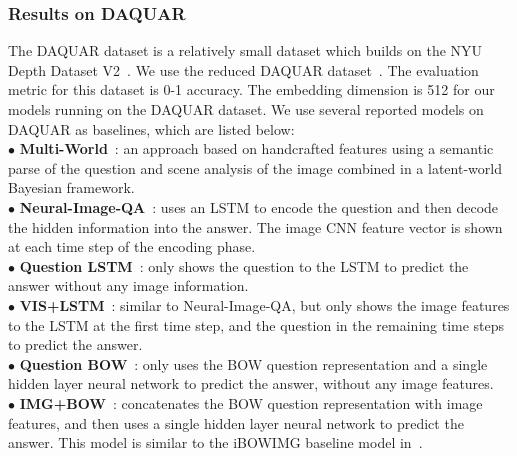 \subsubsection{Results on DAQUAR}
The DAQUAR dataset is a relatively small dataset which builds on the NYU Depth Dataset V2~\cite{Silberman:ECCV12}. We use the reduced DAQUAR dataset~\cite{DBLP:journals/corr/MalinowskiF14}. The evaluation metric for this dataset is 0-1 accuracy. 
The embedding dimension is 512 for our models running on the DAQUAR dataset. 
We use several reported models on DAQUAR as baselines, which are listed below:\\
{$\bullet$} {\bf{Multi-World}}~\cite{DBLP:journals/corr/MalinowskiF14}: an approach based on handcrafted features using a semantic parse of the question and scene analysis of the image combined in a latent-world Bayesian framework.\\ 
{$\bullet$} {\bf{Neural-Image-QA}}~\cite{malinowski2015ask}: uses an LSTM to encode the question and then decode the hidden information into the answer. The image CNN feature vector is shown at each time step of the encoding phase.\\
{$\bullet$} {\bf{Question LSTM}}~\cite{malinowski2015ask}: only shows the question to the LSTM to predict the answer without any image information.\\
{$\bullet$} {\bf{VIS+LSTM}}~\cite{DBLP:journals/corr/RenKZ15}: similar to Neural-Image-QA, but only shows the image features to the LSTM at the first time step, and the question in the remaining time steps to predict the answer.\\
{$\bullet$} {\bf{Question BOW}}~\cite{DBLP:journals/corr/RenKZ15}: only uses the BOW question representation and a single hidden layer neural network to predict the answer, without any image features.\\
{$\bullet$} {\bf{IMG+BOW}}~\cite{DBLP:journals/corr/RenKZ15}: concatenates the BOW question representation with image features, and then uses a single hidden layer neural network to predict the answer. This model is similar to the iBOWIMG baseline model in~\cite{zhou2015simple}.

